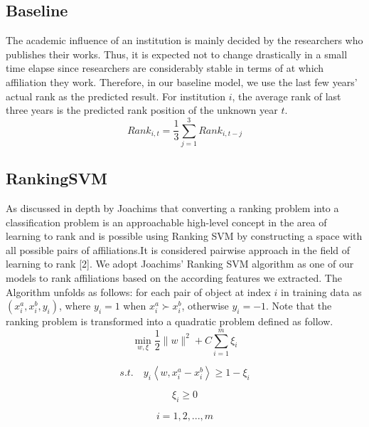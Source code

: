 \documentclass[letterpaper]{article}
\begin{document}
\subsection{Baseline}
The academic influence of an institution is mainly decided by the researchers who publishes their works. Thus, it is expected not to change drastically in a small time elapse since researchers are considerably stable in terms of at which affiliation they work. Therefore, in our baseline model, we use the last few years' actual rank as the predicted result. For institution $i$, the average rank of last three years is the predicted rank position of the unknown year $t$.\\
\begin{equation}
Rank_{i,t} = \frac{1}{3} \sum_{j=1}^{3} Rank_{i,t-j}
\end{equation}



\subsection{RankingSVM}
As discussed in depth by Joachims that converting a ranking problem into a classification problem is an approachable high-level concept in the area of learning to rank and is possible using Ranking SVM by constructing a space with all possible pairs of affiliations.It is considered pairwise approach in the field of learning to rank [2]. We adopt Joachims' Ranking SVM algorithm as one of our models to rank affiliations based on the according features we extracted. 
The Algorithm unfolds as follows: for each pair of object at index $i$ in training data as $(x_i^a,x_i^b,y_i)$, where $y_i=1$ when $x_i^a \succ x_i^b$, otherwise $y_i=-1$. Note that the ranking problem is transformed into a quadratic problem defined as follow.
\begin{equation}
\min_{w,\xi}  \frac{1}{2}\|w\|^2 + C\sum_{i=1}^{m}\xi_i
\end{equation}

\begin{equation}
s.t. \quad y_i \left \langle w,x_i^a-x_i^b\right \rangle \geq 1-\xi_i
\end{equation}

\begin{equation}
    \xi_i \geq 0
\end{equation}

\begin{equation}
 i = 1,2,...,m     
\end{equation}
\end{document}
